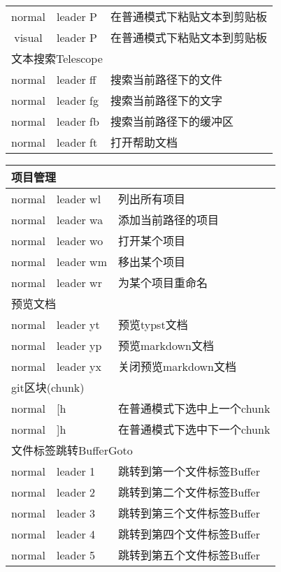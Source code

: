 \documentclass[11pt]{article}
\begin{document}
\begin{left}
\begin{tabular}{|c|l|l|}
    normal & leader P & 在普通模式下粘贴文本到剪贴板 \\
    visual & leader P & 在普通模式下粘贴文本到剪贴板 \\
    \hline \multicolumn{3}{|l|}{文本搜索Telescope} \\ \hline
    normal & leader ff & 搜索当前路径下的文件 \\
    normal & leader fg & 搜索当前路径下的文字 \\
    normal & leader fb & 搜索当前路径下的缓冲区 \\
    normal & leader ft & 打开帮助文档 \\    
    \hline
  \end{tabular}  
\end{left}
\begin{left}
  \begin{tabular}{|c|l|l|}
    \hline \multicolumn{3}{|l|}{项目管理} \\ \hline                        
    normal & leader wl & 列出所有项目 \\
    normal & leader wa & 添加当前路径的项目 \\
    normal & leader wo & 打开某个项目 \\
    normal & leader wm & 移出某个项目 \\
    normal & leader wr & 为某个项目重命名 \\
    \hline \multicolumn{3}{|l|}{预览文档} \\ \hline
    normal & leader yt & 预览typst文档 \\    
    normal & leader yp & 预览markdown文档 \\
    normal & leader yx & 关闭预览markdown文档 \\
    \hline \multicolumn{3}{|l|}{git区块(chunk)} \\ \hline
    normal & [h & 在普通模式下选中上一个chunk \\
    normal & ]h & 在普通模式下选中下一个chunk \\
    \hline \multicolumn{3}{|l|}{文件标签跳转BufferGoto} \\ \hline
    normal & leader 1 & 跳转到第一个文件标签Buffer \\
    normal & leader 2 & 跳转到第二个文件标签Buffer \\
    normal & leader 3 & 跳转到第三个文件标签Buffer \\
    normal & leader 4 & 跳转到第四个文件标签Buffer \\
    normal & leader 5 & 跳转到第五个文件标签Buffer \\

\end{tabular}
\end{left}
\end{document}
